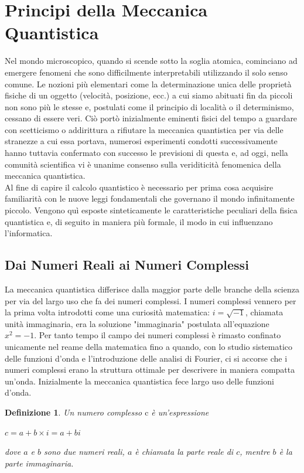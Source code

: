 \documentclass[12pt,a4paper,openright]{report}
\newtheorem{mydef}{Definizione}[chapter]
\begin{document}
\section{Principi della Meccanica Quantistica}
Nel mondo microscopico, quando si scende sotto la soglia atomica, cominciano ad emergere fenomeni che sono difficilmente interpretabili utilizzando il solo senso comune.
Le nozioni più elementari come la determinazione unica delle proprietà fisiche di un oggetto (velocità, posizione, ecc.) a cui siamo abituati fin da piccoli non sono più le stesse e,
postulati come il principio di località o il determinismo, cessano di essere veri.
Ciò portò inizialmente eminenti fisici del tempo a guardare con scetticismo o addirittura a rifiutare la meccanica quantistica per via delle stranezze a cui essa portava,
numerosi esperimenti condotti successivamente hanno tuttavia confermato con successo le previsioni di questa e, ad oggi, nella comunità scientifica vi è unanime consenso sulla veriditicità fenomenica della meccanica quantistica.\\
Al fine di capire il calcolo quantistico è necessario per prima cosa acquisire familiarità con le nuove leggi fondamentali che governano il mondo infinitamente piccolo.
Vengono quì esposte sinteticamente le caratteristiche peculiari della fisica quantistica e, di seguito in maniera più formale, il modo in cui influenzano l'informatica.

\subsection{Dai Numeri Reali ai Numeri Complessi}
La meccanica quantistica differisce dalla maggior parte delle branche della scienza per via del largo uso che fa dei numeri complessi.
I numeri complessi vennero per la prima volta introdotti come una curiosità matematica: $i=\sqrt{-1}$, chiamata unità immaginaria, era la soluzione "immaginaria" postulata
all'equazione $x^2=-1$. Per tanto tempo il campo dei numeri complessi è rimasto confinato unicamente nel reame della matematica fino a quando,
con lo studio sistematico delle funzioni d'onda e l'introduzione delle analisi di Fourier, ci si accorse che i numeri complessi erano la struttura
ottimale per descrivere in maniera compatta un'onda. Inizialmente la meccanica quantistica fece largo uso delle funzioni d'onda.\par
\begin{mydef}
    Un numero complesso $\text{c}$ è un'espressione
    \begin{center}
        $c = a + b \times i = a + bi$\\
    \end{center}
        dove $a$ e $b$ sono due numeri reali, $a$ è chiamata la parte reale di $c$, mentre $b$ è la parte immaginaria.
    
\end{mydef}
\end{document}
